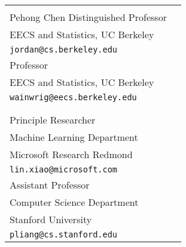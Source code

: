 \documentclass{res} %
\begin{document}
\begin{resume}
\begin{tabular}{ll}
\begin{minipage}{0.5\textwidth}
{\bf Michael I. Jordan}\\
Pehong Chen Distinguished Professor\\
EECS and Statistics, UC Berkeley\\
{\tt jordan@cs.berkeley.edu}
\end{minipage}&
\begin{minipage}{0.5\textwidth}
{\bf Martin J. Wainwright}\\
Professor\\
EECS and Statistics, UC Berkeley\\
{\tt wainwrig@eecs.berkeley.edu}
\end{minipage}\\\\
\begin{minipage}{0.5\textwidth}
{\bf Lin Xiao}\\
Principle Researcher\\
Machine Learning Department\\
Microsoft Research Redmond\\
{\tt lin.xiao@microsoft.com}
\end{minipage}&
\begin{minipage}{0.5\textwidth}
{\bf Percy Liang}\\
Assistant Professor\\
Computer Science Department\\
Stanford University\\
{\tt pliang@cs.stanford.edu}
\end{minipage}
\end{tabular}

\end{resume}
\end{document}
